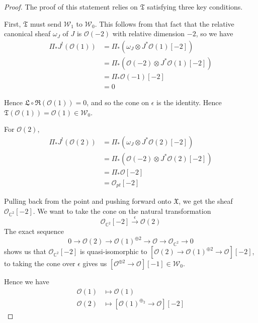 \begin{proof}
	
The proof of this statement relies on $\mathfrak{T}$ satisfying three key conditions. 

First, $\mathfrak{T}$ must send $\mathcal{W}_1$ to $\mathcal{W}_{0}$. This follows from that fact that the relative canonical sheaf $\omega_J$ of $J$ is $\mathcal{O}(-2)$ with relative dimension $-2$, so we have 
\begin{align}
\Pi_{*}J^{!}(\mathcal{O}(1)) &= \Pi_{*}\left(\omega_{J}\otimes  J^{*} \mathcal{O}(1)[-2] \right) \\
&= \Pi_{*}\left( \mathcal{O}(-2)\otimes  J^{*}\mathcal{O}(1)[-2] \right) \\
&= \Pi_{*}\mathcal{O}(-1)[-2] \\
&=0  
\end{align}

Hence $\mathfrak{L} \circ \mathfrak{R} (\mathcal{O}(1))=0$, and so the cone on $\epsilon$ is the identity. Hence $\mathfrak{T}(\mathcal{O}(1)) = \mathcal{O}(1)\in \mathcal{W_0}$.

For $\mathcal{O}(2)$, 
\begin{align}
\Pi_{*}J^{!}(\mathcal{O}(2)) &= \Pi_{*}\left(\omega_{J}\otimes  J^{*} \mathcal{O}(2)[-2] \right) \\
&= \Pi_{*}\left( \mathcal{O}(-2)\otimes  J^{*}\mathcal{O}(2)[-2] \right) \\
&= \Pi_{*}\mathcal{O}[-2] \\
&= \mathcal{O}_{pt}[-2]
\end{align}

Pulling back from the point and pushing forward onto $\mathfrak{X}$, we get the sheaf $\mathcal{O}_{\mathbb{C}^{2}}[-2]$. We want to take the cone on the natural transformation $$
\mathcal{O}_{\mathbb{C}^2}[-2]\xrightarrow{\epsilon} \mathcal{O}(2)
$$ The exact sequence $$
0 \to \mathcal{O}(2)\to \mathcal{O}(1) ^{\oplus 2} \to \mathcal{O} \to \mathcal{O}_{\mathbb{C}^{2}}\to 0
$$ shows us that $\mathcal{O}_{\mathbb{C}^2}[-2]$ is quasi-isomorphic to $\left[ \mathcal{O}(2)\to \mathcal{O}(1)^{\oplus{2}}\to \mathcal{O} \right][-2]$, to taking the cone over $\epsilon$ gives us $\left[ \mathcal{O}^{\oplus{2}}\to \mathcal{O} \right][-1] \in \mathcal{W}_0.$

Hence we have 
\begin{align}
\mathcal{O}(1) &\mapsto \mathcal{O}(1) \\
\mathcal{O}(2) &\mapsto \left[ \mathcal{O}(1)^{\oplus_{2}}\to \mathcal{O} \right][-2] 
\end{align}


\end{proof}

